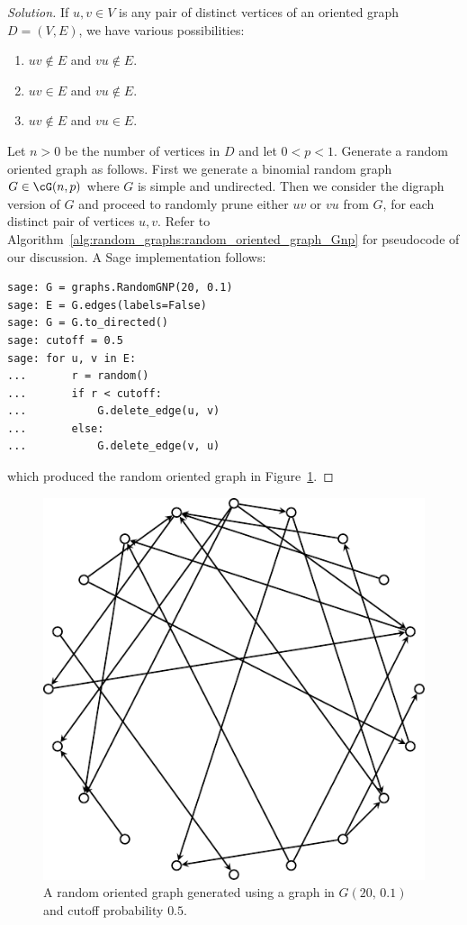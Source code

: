 \begin{proof}[Solution]
If $u,v \in V$ is any pair of distinct vertices of an oriented graph
$D = (V,E)$, we have various possibilities:
\begin{enumerate}
\item $uv \notin E$ and $vu \notin E$.

\item $uv \in E$ and $vu \notin E$.

\item $uv \notin E$ and $vu \in E$.
\end{enumerate}
Let $n > 0$ be the number of vertices in $D$ and let
$0 < p < 1$. Generate a random oriented graph as follows. First we
generate a binomial random graph $G \in \cG(n,p)$ where $G$ is simple
and undirected. Then we consider the digraph version of $G$ and
proceed to randomly prune either $uv$ or $vu$ from $G$, for each
distinct pair of vertices $u,v$. Refer to
Algorithm~\ref{alg:random_graphs:random_oriented_graph_Gnp} for
pseudocode of our discussion. A Sage implementation follows:
\begin{lstlisting}
sage: G = graphs.RandomGNP(20, 0.1)
sage: E = G.edges(labels=False)
sage: G = G.to_directed()
sage: cutoff = 0.5
sage: for u, v in E:
...       r = random()
...       if r < cutoff:
...           G.delete_edge(u, v)
...       else:
...           G.delete_edge(v, u)
\end{lstlisting}
which produced the random oriented graph in
Figure~\ref{fig:random_graphs:random_oriented_graph}.
\end{proof}

\begin{figure}[!htbp]
\centering
{}
\includegraphics{image/random-graphs/random-oriented-graph}
\caption{A random oriented graph generated using a graph in
  $G(20,\, 0.1)$ and cutoff probability $0.5$.}
\label{fig:random_graphs:random_oriented_graph}
\end{figure}


